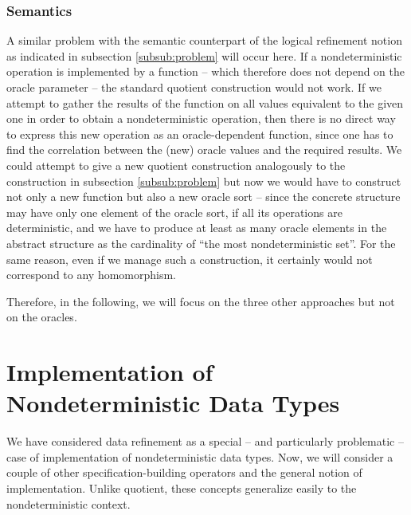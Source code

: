 \subsubsection{Semantics}
A similar problem with the semantic counterpart of the logical refinement notion as indicated in subsection \ref{subsub:problem} will occur here. If a nondeterministic operation
is implemented by a function -- which therefore does not depend on the oracle parameter -- the standard quotient construction would not work. If we attempt to gather the results of the function on all values equivalent to the given one in order to obtain a nondeterministic operation, then there is no direct way to express this new operation as an oracle-dependent function, since one has to find the correlation between the (new) oracle values and the required results. We could attempt to give a new quotient construction analogously to the construction in subsection \ref{subsub:problem} but now we would have to construct not only a new function but also a new oracle sort -- since the concrete structure may have only one element of the oracle sort, if all its operations are deterministic, and we have to produce at least as many oracle elements in the abstract structure as the cardinality of ``the most nondeterministic set''. For the same reason, even if we manage such a construction, it certainly would not
correspond to any homomorphism.

Therefore, in the following, we will focus on the three other approaches but not on the oracles.




\section{Implementation of Nondeterministic Data Types}\label{se:impl} 


We have considered data refinement as a special -- and particularly problematic -- case of implementation of nondeterministic data types. Now, we will consider a couple of other specification-building operators and the general notion of implementation. Unlike quotient, these concepts generalize easily to the nondeterministic context.

